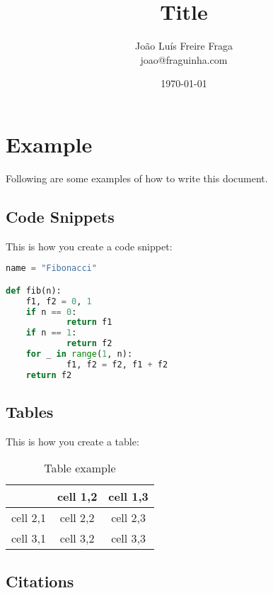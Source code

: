 \documentclass{article}
\title{Title}
\author{João Luís Freire Fraga\\\small{joao@fraguinha.com}}
\date{\today}
\begin{document}
\maketitle
\thispagestyle{empty}
\pagebreak
\pagestyle{fancy}

\section{Example}\label{sec:examplecontent}

Following are some examples of how to write this document.

\subsection{Code Snippets}\label{subsec:codesnippets}

This is how you create a code snippet:

\begin{lstlisting}[language=Python, caption=fibonacci]
name = "Fibonacci"

def fib(n):
	f1, f2 = 0, 1
	if n == 0:
			return f1
	if n == 1:
			return f2
	for _ in range(1, n):
			f1, f2 = f2, f1 + f2
	return f2
\end{lstlisting}

\subsection{Tables}\label{subsec:tables}

This is how you create a table:

\begin{table}[H]
  \begin{center}
    \begin{tabular}{ | c || c | c | }
      \hline
               & cell 1,2 & cell 1,3 \\
      \hline
      \hline
      cell 2,1 & cell 2,2 & cell 2,3 \\
      cell 3,1 & cell 3,2 & cell 3,3 \\
      \hline
    \end{tabular}
    \caption{Table example}\label{tbl:tableexample}
  \end{center}
\end{table}

\subsection{Citations}\label{subsec:citations}
\end{document}
